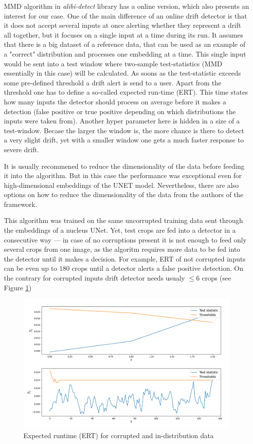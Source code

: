 MMD algorithm in \textit{alibi-detect} library has a online version, which also presents an interest for our case. One of the main difference of an online drift detector is that it does not accept several inputs at once alerting whether they represent a drift all together, but it focuses on a single input at a time during its run. It assumes that there is a big dataset of a reference data, that can be used as an example of a "correct" distribution and processes one embedding at a time. This single input would be sent into a test window where two-sample test-statistics (MMD essentially in this case) will be calculated. As soons as the test-statistic exceeds some pre-defined threshold a drift alert is send to a user. Apart from the threshold one has to define a so-called expected run-time (ERT). This time states how many inputs the detector should process on average before it makes a detection (false positive or true positive depending on which distributions the inputs were taken from). Another hyper parameter here is hidden in a size of a test-window. Becase the larger the window is, the more chance is there to detect a very slight drift, yet with a smaller window one gets a much faster response to severe drift. 

It is usually recommened to reduce the dimensionality of the data before feeding it into the algorithm. But in this case the performance was exceptional even for high-dimensional embeddings of the UNET model. Nevertheless, there are also options on how to reduce the dimensionality of the data from the authors of the framework.

This algorithm was trained on the same uncorrupted training data sent through the embeddings of a nucleus UNet. Yet, test crops are fed into a detector in a consecutive way --- in case of no corruptions present it is not enough to feed only several crops from one image, as the algoritm requires more data to be fed into the detector until it makes a decision. For example, ERT of not corrupted inputs can be even up to $180$ crops until a detector alerts a false positive detection. On the contrary for corrupted inputs drift detector needs usualy $\leq 6$ crops (see Figure \ref{fig:online-ert})
\begin{figure}[H]
	\begin{center}
		\includegraphics[width=0.6\linewidth]{bilder/drift-detection/online.png}
		\caption{Expected runtime (ERT) for corrupted and in-distribution data}\label{fig:online-ert}
	\end{center}
\end{figure}


